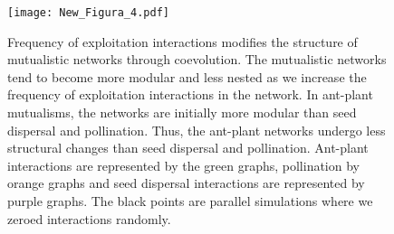 \documentclass[a4paper, 12pt]{article}
\begin{document}
\begin{singlespace}
\begin{figure}[H]
  \texttt{[image: New\_Figura\_4.pdf]}
  \vspace*{-7mm}
  \caption{Frequency of exploitation interactions modifies the structure of mutualistic networks through coevolution. The mutualistic networks tend to become more modular and less nested as we increase the frequency of exploitation interactions in the network. In ant-plant mutualisms, the networks are initially more modular than seed dispersal and pollination. Thus, the ant-plant networks undergo less structural changes than seed dispersal and pollination. Ant-plant interactions are represented by the green graphs, pollination by orange graphs and seed dispersal interactions are represented by purple graphs. The black points are parallel simulations where we zeroed interactions randomly.}
  \label{fig:4}
\end{figure}
\end{singlespace}
\end{document}
